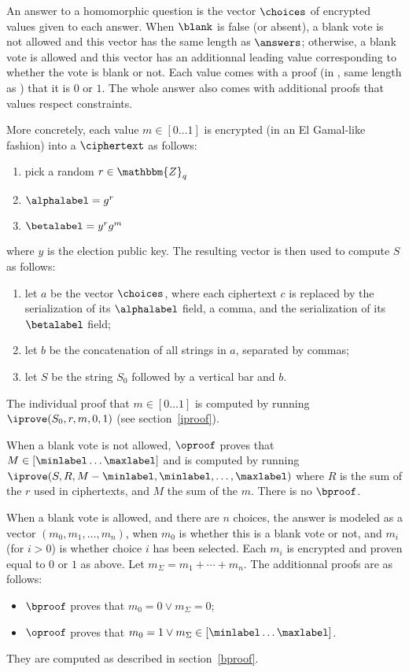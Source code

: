 \documentclass[a4paper]{article}
\newcommand{\Z}{\mathbbm{Z}}
\begin{document}
An answer to a homomorphic question is the vector
$\choices$ of encrypted values given to each answer. When $\blank$ is
false (or absent), a blank vote is not allowed and this vector has the
same length as $\answers$; otherwise, a blank vote is allowed and this
vector has an additionnal leading value corresponding to whether the
vote is blank or not.  Each value comes with a proof (in \iproofs,
same length as \choices) that it is $0$ or $1$. The whole answer also
comes with additional proofs that values respect constraints.

More concretely, each value $m\in[0\dots1]$ is encrypted (in an El
Gamal-like fashion) into a $\ciphertext$ as follows:
\begin{enumerate}
\item pick a random $r\in\Z_q$
\item $\alphalabel=g^r$
\item $\betalabel=y^rg^m$
\end{enumerate}
where $y$ is the election public key. The resulting vector is then
used to compute $S$ as follows:
\begin{enumerate}
\item let $a$ be the vector $\choices$, where each ciphertext $c$ is
  replaced by the serialization of its $\alphalabel$ field, a comma,
  and the serialization of its $\betalabel$ field;
\item let $b$ be the concatenation of all strings in $a$, separated
  by commas;
\item let $S$ be the string $S_0$ followed by a vertical bar and $b$.
\end{enumerate}

The individual proof that $m\in[0\dots1]$ is computed by running
$\iprove(S_0,r,m,0,1)$ (see section~\ref{iproof}).

When a blank vote is not allowed, $\oproof$ proves that
$M\in[\minlabel\dots\maxlabel]$ and is computed by running
$\iprove(S,R,M-\minlabel,\minlabel,\dots,\maxlabel)$ where $R$ is the
sum of the $r$ used in ciphertexts, and $M$ the sum of the $m$. There
is no $\bproof$.

When a blank vote is allowed, and there are $n$ choices, the answer is
modeled as a vector $(m_0,m_1,\dotsc,m_n)$, when $m_0$ is whether this
is a blank vote or not, and $m_i$ (for $i>0$) is whether choice $i$
has been selected. Each $m_i$ is encrypted and proven equal to $0$ or
$1$ as above. Let $m_\Sigma=m_1+\dotsb+m_n$. The additionnal proofs
are as follows:
\begin{itemize}
\item $\bproof$ proves that $m_0=0\lor m_\Sigma=0$;
\item $\oproof$ proves that $m_0=1\lor m_\Sigma\in[\minlabel\dots\maxlabel]$.
\end{itemize}
They are computed as described in section~\ref{bproof}.
\end{document}
